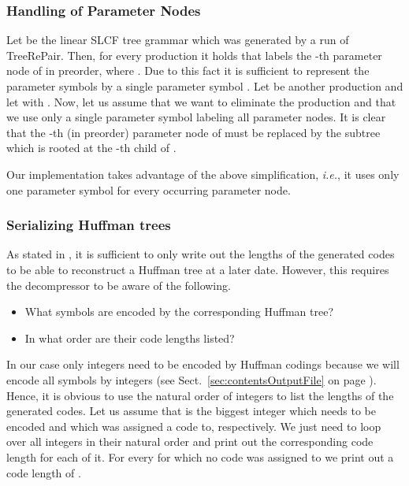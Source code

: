 \documentclass[12pt]{llncs}
\newcommand{\trp}{\mbox{TreeRePair}\xspace}
\newcommand{\hairsp}{\hspace{1pt}}\newcommand{\TODO}{\textcolor{red}{\bf TODO!}\xspace}
\newcommand{\ie}{\mbox{\textit{i.\hairsp{}e.}}\xspace}
\begin{document}
\subsubsection{Handling of Parameter Nodes}\label{sec:handlingOfParameterNodes}

Let  be the linear SLCF tree grammar which was generated by a run of \trp. Then, for every production  it holds that  labels the -th parameter node of  in preorder, where . Due to this fact it is sufficient to represent the parameter symbols  by a single parameter symbol . Let  be another production and let  with . Now, let us assume that we want to eliminate the production  and that we use only a single parameter symbol labeling all parameter nodes. It is clear that the -th (in preorder) parameter node of  must be replaced by the subtree which is rooted at the -th child of . 

Our implementation takes advantage of the above simplification, \ie, it uses only one parameter symbol  for every occurring parameter node.

\subsubsection{Serializing Huffman trees}\label{sec:serializingHuffmanTrees}

As stated in \cite{Deutsch96deflate}, it is sufficient to only write out the lengths of the generated codes to be able to reconstruct a Huffman tree at a later date. However, this requires the decompressor to be aware of the following.
\begin{itemize}
	\item What symbols are encoded by the corresponding Huffman tree?
	\item In what order are their code lengths listed?
\end{itemize}
In our case only integers need to be encoded by Huffman codings because we will encode all symbols by integers (see Sect.~\ref{sec:contentsOutputFile} on page \pageref{sec:contentsOutputFile}). Hence, it is obvious to use the natural order of integers to list the lengths of the generated codes. Let us assume that  is the biggest integer which needs to be encoded and which was assigned a code to, respectively. We just need to loop over all integers  in their natural order and print out the corresponding code length for each of it. For every  for which no code was assigned to we print out a code length of .
\end{document}
